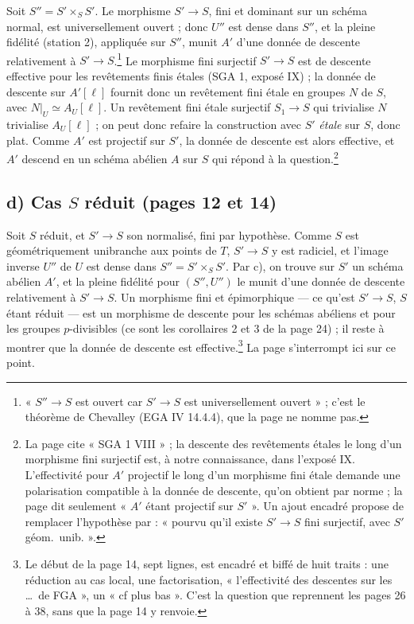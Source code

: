 \documentclass[11pt,a4paper]{article}
\begin{document}
Soit $S'' = S' \times_S S'$. Le morphisme $S' \to S$, fini et dominant sur un
schéma normal, est universellement ouvert ; donc $U''$ est dense dans $S''$,
et la pleine fidélité (station 2), appliquée sur $S''$, munit $A'$ d'une donnée
de descente relativement à $S' \to S$.\footnote{« $S'' \to S$ est ouvert car
$S' \to S$ est universellement ouvert » ; c'est le théorème de Chevalley
(EGA IV 14.4.4), que la page ne nomme pas.} Le morphisme fini surjectif
$S' \to S$ est de descente effective pour les revêtements finis étales (SGA 1,
exposé IX) ; la donnée de descente sur $A'[\ell]$ fournit donc un revêtement
fini étale en groupes $N$ de $S$, avec $N|_U \simeq A_U[\ell]$. Un revêtement
fini étale surjectif $S_1 \to S$ qui trivialise $N$ trivialise
$A_U[\ell]$ ; on peut donc refaire la construction avec $S'$ \emph{étale}
sur $S$, donc plat. Comme $A'$ est projectif sur $S'$, la donnée de descente
est alors effective, et $A'$ descend en un schéma abélien $A$ sur $S$ qui
répond à la question.\footnote{La page cite « SGA 1 VIII » ; la descente des
revêtements étales le long d'un morphisme fini surjectif est, à notre
connaissance, dans l'exposé IX.
L'effectivité pour $A'$ projectif le long d'un morphisme fini étale demande
une polarisation compatible à la donnée de descente, qu'on obtient par
norme ; la page dit seulement « $A'$ étant projectif sur $S'$ ». Un ajout
encadré propose de remplacer l'hypothèse par : « pourvu qu'il existe $S' \to
S$ fini surjectif, avec $S'$ géom.\ unib. ».}

\subsection*{d) Cas $S$ réduit (pages 12 et 14)}

Soit $S$ réduit, et $S' \to S$ son normalisé, fini par hypothèse. Comme $S$ est
géométriquement unibranche aux points de $T$, $S' \to S$ y est radiciel, et
l'image inverse $U''$ de $U$ est dense dans $S'' = S' \times_S S'$. Par c), on
trouve sur $S'$ un schéma abélien $A'$, et la pleine fidélité pour $(S'',
U'')$ le munit d'une donnée de descente relativement à $S' \to S$. Un
morphisme fini et épimorphique --- ce qu'est $S' \to S$, $S$ étant réduit ---
est un morphisme de descente pour les schémas abéliens et pour les groupes
$p$-divisibles (ce sont les corollaires 2 et 3 de la page 24) ; il reste à
montrer que la donnée de descente est effective.\footnote{Le début de la page
14, sept lignes, est encadré et biffé de huit traits : une réduction au cas
local, une factorisation, « l'effectivité des descentes sur les \ldots\ de
FGA », un « cf plus bas ». C'est la question que reprennent les pages 26 à
38, sans que la page 14 y renvoie.} La page s'interrompt ici sur ce point.
\end{document}
